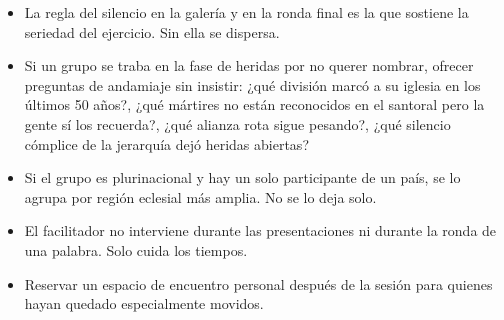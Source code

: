 \documentclass[11pt, a4paper]{article}
\begin{document}
\begin{actividad}
\begin{itemize}
  \item La regla del silencio en la galería y en la ronda final es la que sostiene la seriedad del ejercicio. Sin ella se dispersa.
  \item Si un grupo se traba en la fase de heridas por no querer nombrar, ofrecer preguntas de andamiaje sin insistir: ¿qué división marcó a su iglesia en los últimos 50 años?, ¿qué mártires no están reconocidos en el santoral pero la gente sí los recuerda?, ¿qué alianza rota sigue pesando?, ¿qué silencio cómplice de la jerarquía dejó heridas abiertas?
  \item Si el grupo es plurinacional y hay un solo participante de un país, se lo agrupa por región eclesial más amplia. No se lo deja solo.
  \item El facilitador no interviene durante las presentaciones ni durante la ronda de una palabra. Solo cuida los tiempos.
  \item Reservar un espacio de encuentro personal después de la sesión para quienes hayan quedado especialmente movidos.
\end{itemize}

\end{actividad}

\newpage
\end{document}
